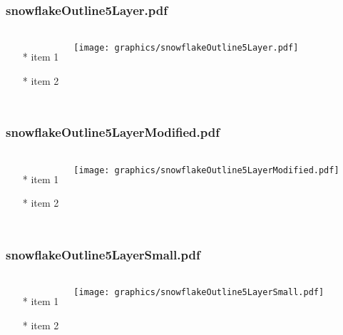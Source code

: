 \begin{frame} \frametitle{snowflakeOutline5Layer.pdf}
    \begin{columns}[c]
        \begin{itemize}
            \item[*] item 1
            \item[*] item 2
        \end{itemize}
        \begin{minipage}{\linewidth}
            \begin{center}
            \texttt{[image: graphics/snowflakeOutline5Layer.pdf]}
            \label{gfx:snowflakeOutline5Layer.pdf}
            \end{center}
        \end{minipage}
    \end{columns}
\end{frame}
\begin{frame} \frametitle{snowflakeOutline5LayerModified.pdf}
    \begin{columns}[c]
        \begin{itemize}
            \item[*] item 1
            \item[*] item 2
        \end{itemize}
        \begin{minipage}{\linewidth}
            \begin{center}
            \texttt{[image: graphics/snowflakeOutline5LayerModified.pdf]}
            \label{gfx:snowflakeOutline5LayerModified.pdf}
            \end{center}
        \end{minipage}
    \end{columns}
\end{frame}
\begin{frame} \frametitle{snowflakeOutline5LayerSmall.pdf}
    \begin{columns}[c]
        \begin{itemize}
            \item[*] item 1
            \item[*] item 2
        \end{itemize}
        \begin{minipage}{\linewidth}
            \begin{center}
            \texttt{[image: graphics/snowflakeOutline5LayerSmall.pdf]}
            \label{gfx:snowflakeOutline5LayerSmall.pdf}
            \end{center}
        \end{minipage}
    \end{columns}
\end{frame}
